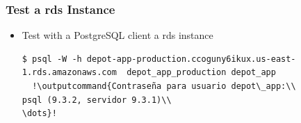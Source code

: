 \documentclass{beamer}
\newcommand{\outputcommand}[1]{\color{darkgreen}{#1}}
\begin{document}
\begin{frame}
\frametitle{Test a \acrshort{rds} Instance}
\begin{itemize}
 \item Test with a PostgreSQL client a \acrshort{rds} instance
 \lstset{language=shell, breaklines=true, escapechar=!}
  \begin{lstlisting}[escapechar=!]
  $ psql -W -h depot-app-production.ccoguny6ikux.us-east-1.rds.amazonaws.com  depot_app_production depot_app
  !\outputcommand{Contraseña para usuario depot\_app:\\
psql (9.3.2, servidor 9.3.1)\\
\dots}!
 \end{lstlisting}
 \end{itemize}
\end{frame}
\end{document}
